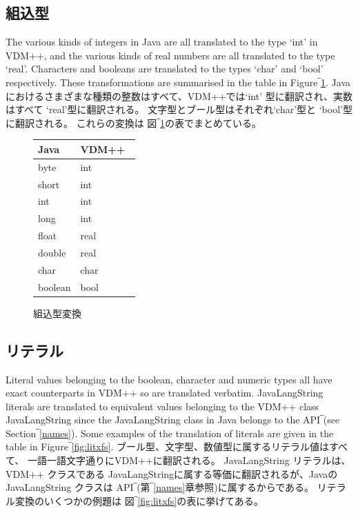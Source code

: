 \documentclass[\pformat,12pt]{jarticle}
\newcommand{\JAVA}{Java}
\newcommand{\VDM}{VDM++}
\begin{document}
\subsection{組込型}\label{types}

The various kinds of integers in Java are all translated to the type
`int' in VDM++, and the various kinds of real numbers are all
translated to the type `real'. Characters and booleans are translated
to the types `char' and `bool' respectively. These transformations are
summarised in the table in Figure‾\ref{fig:typexfs}.
Javaにおけるさまざまな種類の整数はすべて、VDM++では`int' 型に翻訳され、実数はすべて `real'型に翻訳される。
文字型とブール型はそれぞれ`char'型と `bool'型に翻訳される。
これらの変換は 図‾\ref{fig:typexfs}の表でまとめている。

\begin{figure}[htbp]
  \begin{center}
\begin{longtable}{|l|l|}
\hline
  \JAVA\   & \VDM\ \\ \hline \hline
  byte   & int \\ \hline
  short  & int \\ \hline
  int    & int \\ \hline
  long   & int \\ \hline
  float  & real \\ \hline
  double & real \\ \hline
  char  & char \\ \hline
  boolean  & bool \\ \hline
\end{longtable}    
    \caption{組込型変換}
    \label{fig:typexfs}
  \end{center}
\end{figure}

\subsection{リテラル}\label{literals}

Literal values belonging to the boolean, character and numeric types
all have exact counterparts in VDM++ so are translated
verbatim. JavaLangString literals are translated to equivalent values
belonging to the VDM++ class JavaLangString since the JavaLangString class in
Java belongs to the API‾(see Section‾\ref{names}). Some
examples of the translation of literals are given in
the table in Figure‾\ref{fig:litxfs}.  
ブール型、文字型、数値型に属するリテラル値はすべて、 一語一語文字通りにVDM++に翻訳される。
JavaLangString リテラルは、 VDM++ クラスである JavaLangStringに属する等価に翻訳されるが、Javaの JavaLangString クラスは API‾(第‾\ref{names}章参照)に属するからである。
リテラル変換のいくつかの例題は 図‾\ref{fig:litxfs}の表に挙げてある。
\end{document}
